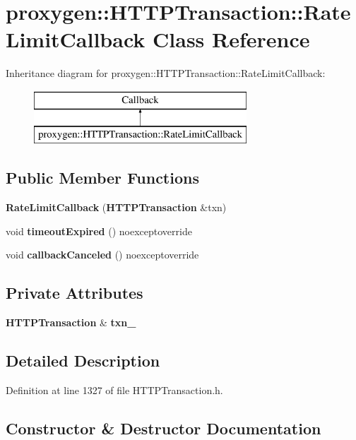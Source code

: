 \section{proxygen\+:\+:H\+T\+T\+P\+Transaction\+:\+:Rate\+Limit\+Callback Class Reference}
\label{classproxygen_1_1HTTPTransaction_1_1RateLimitCallback}
Inheritance diagram for proxygen\+:\+:H\+T\+T\+P\+Transaction\+:\+:Rate\+Limit\+Callback\+:\begin{figure}[H]
\begin{center}
\leavevmode
\includegraphics[height=2.000000cm]{classproxygen_1_1HTTPTransaction_1_1RateLimitCallback}
\end{center}
\end{figure}
\subsection*{Public Member Functions}
\begin{DoxyCompactItemize}
\item 
{\bf Rate\+Limit\+Callback} ({\bf H\+T\+T\+P\+Transaction} \&txn)
\item 
void {\bf timeout\+Expired} () noexceptoverride
\item 
void {\bf callback\+Canceled} () noexceptoverride
\end{DoxyCompactItemize}
\subsection*{Private Attributes}
\begin{DoxyCompactItemize}
\item 
{\bf H\+T\+T\+P\+Transaction} \& {\bf txn\+\_\+}
\end{DoxyCompactItemize}


\subsection{Detailed Description}


Definition at line 1327 of file H\+T\+T\+P\+Transaction.\+h.



\subsection{Constructor \& Destructor Documentation}
